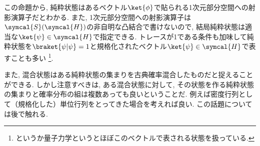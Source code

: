 この命題から, 純粋状態はあるベクトル$\ket{\phi}$で貼られる1次元部分空間への射影演算子だとわかる. 
また, 1次元部分空間への射影演算子は$\symcal{S}(\symcal{H})$の非自明な凸結合で書けないので, 結局純粋状態は適当な$\ket{\psi}\in\symcal{H}$で指定できる. 
トレースが1である条件も加味して純粋状態を$\braket{\psi|\psi}=1$と規格化されたベクトル$\ket{\psi}\in\symcal{H}$で表すことも多い
\footnote{というか量子力学というとほぼこのベクトルで表される状態を扱っている. }. 

また, 混合状態はある純粋状態の集まりを古典確率混合したものだと捉えることができる. 
しかし注意すべきは, ある混合状態に対して, その状態を作る純粋状態の集まりと確率分布の組は複数あっても良いということだ. 
例えば密度行列として（規格化した）単位行列をとってきた場合を考えれば良い. 
この話題については後で触れる. 





